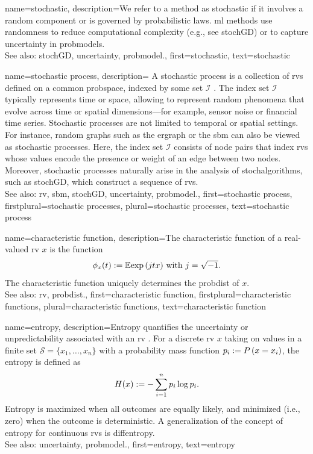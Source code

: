 {name={stochastic},
	description={We refer to a  method as stochastic if it involves a 
		random component or is governed by probabilistic laws. \Gls{ml} methods use randomness 
		to reduce computational complexity (e.g., see \gls{stochGD}) or 
		to capture \gls{uncertainty} in \glspl{probmodel}.
		\\
		See also: \gls{stochGD}, \gls{uncertainty}, \gls{probmodel}.},
	first={stochastic},
	text={stochastic}
}

{name={stochastic process},
	description={
		A \gls{stochastic} process is a collection of 
		\glspl{rv} defined on a common \gls{probspace}, indexed by some set 
		$\mathcal{I}$ \cite{papoulis,GrayProbBook,Brockwell91}. The index set 
		$\mathcal{I}$ typically represents time or space, allowing to represent 
		random phenomena that evolve across time or spatial dimensions—for example, 
		sensor noise or financial time series. Stochastic processes are not limited 
		to temporal or spatial settings. For instance, random \glspl{graph} such as 
		the \gls{ergraph} or the \gls{sbm} 
		can also be viewed as stochastic processes. Here, the index set $\mathcal{I}$ 
		consists of node pairs that index \glspl{rv} whose values encode 
		the presence or weight of an edge between two nodes. Moreover, \gls{stochastic} 
		processes naturally arise in the analysis of \glspl{stochalgorithm}, 
		such as \gls{stochGD}, which construct a sequence of \glspl{rv}. 
		\\
		See also:  \gls{rv}, \gls{sbm}, \gls{stochGD}, \gls{uncertainty}, \gls{probmodel}.},
	first={stochastic process},
	firstplural={stochastic processes},
	plural={stochastic processes},
	text={stochastic process}
}

{name={characteristic function},
	description={The characteristic \gls{function} 
		of a real-valued \gls{rv} $x$ is the \gls{function} \cite[Sec. 26]{BillingsleyProbMeasure}
		$$ \phi_{x}(t) := \mathbb{E} { \exp\,(j t x) } \mbox{ with } j = \sqrt{-1}.$$
	 	The characteristic \gls{function} uniquely determines the \gls{probdist} of $x$. 
		\\
		See also: \gls{rv}, \gls{probdist}.},
	first={characteristic function},
	firstplural={characteristic functions}, 
	plural={characteristic functions},
	text={characteristic function}
}

{name={entropy},
	description={Entropy quantifies the \gls{uncertainty} or unpredictability associated with an \gls{rv} \cite{coverthomas}. 
		For a discrete \gls{rv} $x$ taking on values in a finite set $\mathcal{S} = \{x_1, \ldots, x_n\}$ with 
		a \gls{probability} mass \gls{function} $p_i := P\left(x = x_i\right)$, the entropy is defined as
		\[
		H(x) := -\sum_{i=1}^n p_i \log p_i.
		\]
		Entropy is maximized when all outcomes are equally likely, and minimized (i.e., zero) 
		when the outcome is deterministic. A \gls{generalization} of the concept of entropy for continuous 
		\glspl{rv} is \gls{diffentropy}. 
		\\
		See also: \gls{uncertainty}, \gls{probmodel}.},
	first={entropy},
	text={entropy}
}

